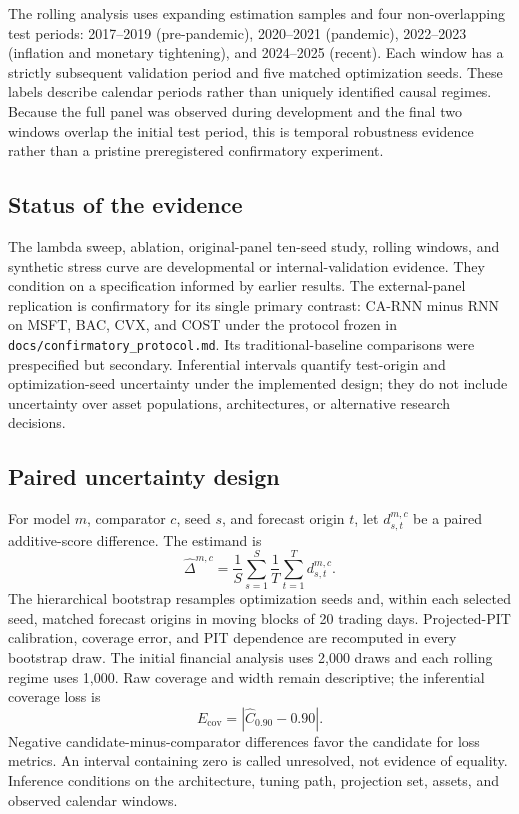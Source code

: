 \documentclass[11pt]{article}
\begin{document}
The rolling analysis uses expanding estimation samples and four non-overlapping
test periods: 2017--2019 (pre-pandemic), 2020--2021 (pandemic), 2022--2023
(inflation and monetary tightening), and 2024--2025 (recent). Each window has a
strictly subsequent validation period and five matched optimization seeds. These
labels describe calendar periods rather than uniquely identified causal regimes.
Because the full panel was observed during development and the final two windows
overlap the initial test period, this is temporal robustness evidence rather than
a pristine preregistered confirmatory experiment.

\subsection{Status of the evidence}

The lambda sweep, ablation, original-panel ten-seed study, rolling windows, and
synthetic stress curve are developmental or internal-validation evidence. They
condition on a specification informed by earlier results. The external-panel
replication is confirmatory for its single primary contrast: CA-RNN
minus RNN on MSFT, BAC, CVX, and COST under the protocol frozen in
\texttt{docs/confirmatory\_protocol.md}. Its traditional-baseline comparisons
were prespecified but secondary. Inferential intervals quantify test-origin and
optimization-seed uncertainty under the implemented design; they do not include
uncertainty over asset populations, architectures, or alternative research
decisions.

\subsection{Paired uncertainty design}

For model $m$, comparator $c$, seed $s$, and forecast origin $t$, let
$d_{s,t}^{m,c}$ be a paired additive-score difference. The estimand is
\[
 \widehat\Delta^{m,c}=\frac{1}{S}\sum_{s=1}^S\frac{1}{T}
 \sum_{t=1}^T d_{s,t}^{m,c}.
\]
The hierarchical bootstrap resamples optimization seeds and, within each selected
seed, matched forecast origins in moving blocks of 20 trading days. Projected-PIT
calibration, coverage error, and PIT dependence are recomputed in every bootstrap
draw. The initial financial analysis uses 2,000 draws and each rolling regime uses
1,000. Raw coverage and width remain descriptive; the inferential coverage loss is
\[
 E_{\mathrm{cov}}=|\widehat C_{0.90}-0.90|.
\]
Negative candidate-minus-comparator differences favor the candidate for loss
metrics. An interval containing zero is called unresolved, not evidence of
equality. Inference conditions on the architecture, tuning path, projection set,
assets, and observed calendar windows.
\end{document}
